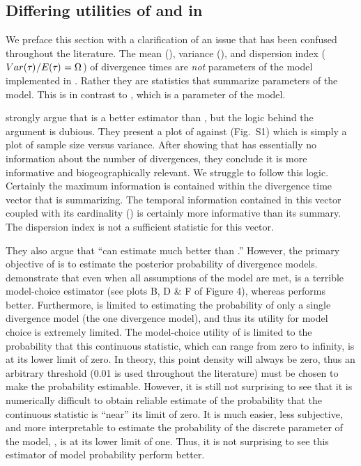 \documentclass[letterpaper,12pt]{article}
\begin{document}
\begin{linenumbers}
\section*{Differing utilities of \numt{} and \vmratio{} in \msb}
We preface this section with a clarification of an issue that has
been confused throughout the \msb literature.
The mean (\meant{}{}), variance (\vart{}{}), and dispersion index
($Var(\tau_{}{})_{}/E(\tau_{})_{} = \Omega_{}$) of divergence times are \emph{not} parameters
of the model implemented in \msb.
Rather they are statistics that summarize parameters of the model.
This is in contrast to \numt{}, which is a parameter of the model.

\citet{Hickerson2013} strongly argue that \vmratio{} is a better estimator than
\numt{}, but the logic behind the argument is dubious.
They present a plot of \numt{} against \vmratio{} (Fig.~S1) which is simply a
plot of sample size versus variance.
After showing that \vmratio{} has essentially no information about the
number of divergences, they conclude it is more informative and biogeographically
relevant.
We struggle to follow this logic.
Certainly the maximum information is contained within the divergence time
vector that \vmratio{} is summarizing.
The temporal information contained in this vector coupled with its cardinality
(\numt{}) is certainly more informative than its summary.
The dispersion index is not a sufficient statistic for this vector.

They also argue that ``\msb can estimate \vmratio{} much better than \numt{}.''
However, the primary objective of \msb is to estimate the posterior probability
of divergence models.
\citet{Oaks2012} demonstrate that even when all assumptions of the model are
met, \vmratio is a terrible model-choice estimator (see plots B, D \& F of
Figure 4), whereas \numt{} performs better.
Furthermore, \vmratio{} is limited to estimating the probability of only a
single divergence model (the one divergence model), and thus its utility for
model choice is extremely limited.
The model-choice utility of \vmratio{} is limited to the probability that
this continuous statistic, which can range from zero to infinity, is at its lower
limit of zero. In theory, this point density will always be zero, thus an
arbitrary threshold (0.01 is used throughout the \msb literature) must 
be chosen to make the probability estimable.
However, it is still not surprising to see that it is numerically difficult to
obtain reliable estimate of the probability that the continuous \vmratio{}
statistic is ``near'' its limit of zero.
It is much easier, less subjective, and more interpretable to estimate
the probability of the discrete parameter of the model, \numt{}, is
at its lower limit of one.
Thus, it is not surprising to see this estimator of model probability
perform better.


\end{linenumbers}
\end{document}
